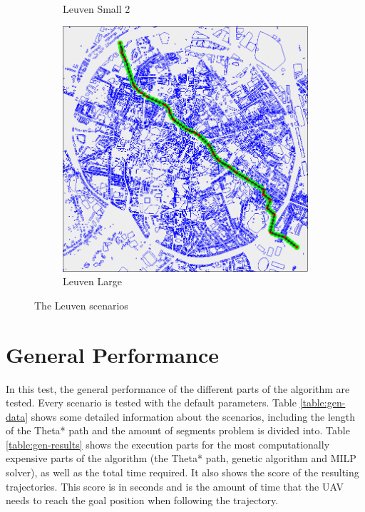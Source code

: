\begin{figure}
\begin{subfigure}[t]{0.46\textwidth}
        		\caption{Leuven Small 2}
        		\label{fig:leuven-small-2}
	\end{subfigure}	
	\par
	\begin{subfigure}[t]{0.8\textwidth}
        		\includegraphics[width=\textwidth]{img/leuven-large}
        		\caption{Leuven Large}
        		\label{fig:leuven-large}
	\end{subfigure}
        
    \caption{The Leuven scenarios}\label{fig:sf-scens}
\end{figure}
\clearpage
\section{General Performance}
In this test, the general performance of the different parts of the algorithm are tested. Every scenario is tested with the default parameters. Table \ref{table:gen-data} shows some detailed information about the scenarios, including the length of the Theta* path and the amount of segments problem is divided into. Table \ref{table:gen-results} shows the execution parts for the most computationally expensive parts of the algorithm (the Theta* path, genetic algorithm and MILP solver), as well as the total time required. It also shows the score of the resulting trajectories. This score is in seconds and is the amount of time that the UAV needs to reach the goal position when following the trajectory. 

